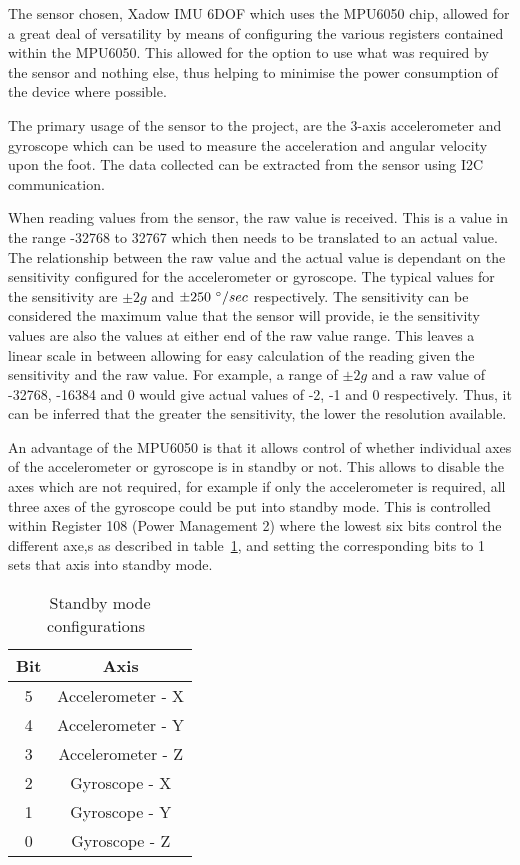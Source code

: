 
The sensor chosen, Xadow IMU 6DOF which uses the MPU6050 chip, allowed for a great deal of versatility by means of configuring the various registers contained within the MPU6050. This allowed for the option to use what was required by the sensor and nothing else, thus helping to minimise the power consumption of the device where possible. \cite{sensor_specs}

The primary usage of the sensor to the project, are the 3-axis accelerometer and gyroscope which can be used to measure the acceleration and angular velocity upon the foot. The data collected can be extracted from the sensor using I2C communication. 

When reading values from the sensor, the raw value is received. This is a value in the range -32768 to 32767 which then needs to be translated to an actual value. The relationship between the raw value and the actual value is dependant on the sensitivity configured for the accelerometer or gyroscope. The typical values for the sensitivity are $\pm 2g$ and $\pm 250~\degree / sec$ respectively. The sensitivity can be considered the maximum value that the sensor will provide, ie the sensitivity values are also the values at either end of the raw value range. This leaves a linear scale in between allowing for easy calculation of the reading given the sensitivity and the raw value. For example, a range of $\pm 2g$ and a raw value of -32768, -16384 and 0 would give actual values of -2, -1 and 0 respectively. Thus, it can be inferred that the greater the sensitivity, the lower the resolution available. \cite{sensor_raw_explanation}

An advantage of the MPU6050 is that it allows control of whether individual axes of the accelerometer or gyroscope is in standby or not. This allows to disable the axes which are not required, for example if only the accelerometer is required, all three axes of the gyroscope could be put into standby mode. This is controlled within Register 108 (Power Management 2) where the lowest six bits control the different axe,s as described in table~\ref{tab:sensor:power}, and setting the corresponding bits to 1 sets that axis into standby mode.

\begin{table}
	\centering
	\begin{tabular}{|c|c|}
		\hline
		Bit & Axis \\
		\hline
		5 & Accelerometer - X \\
		4 & Accelerometer - Y \\
		3 & Accelerometer - Z \\
		2 & Gyroscope - X \\
		1 & Gyroscope - Y \\
		0 & Gyroscope - Z \\
		\hline
	\end{tabular}
	\caption{Standby mode configurations~\cite{sensor_registers}}
	\label{tab:sensor:power}
\end{table}

